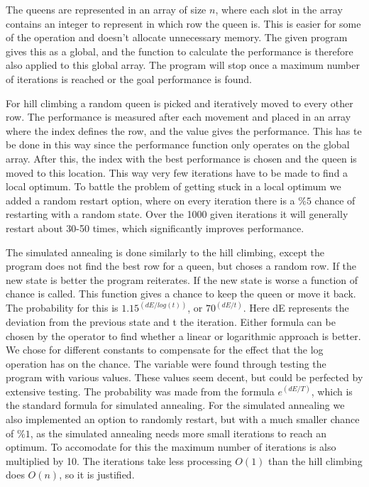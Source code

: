 \documentclass{article}
\begin{document}
The queens are represented in an array of size $n$, where each slot in the array contains an integer to represent in which row the queen is. This is easier for some of the operation and doesn't allocate unnecessary memory. The given program gives this as a global, and the function to calculate the performance is therefore also applied to this global array. The program will stop once a maximum number of iterations is reached or the goal performance is found. 

For hill climbing a random queen is picked and iteratively moved to every other row. The performance is measured after each movement and placed in an array where the index defines the row, and the value gives the performance. This has te be done in this way since the performance function only operates on the global array. After this, the index with the best performance is chosen and the queen is moved to this location. This way very few iterations have to be made to find a local optimum. To battle the problem of getting stuck in a local optimum we added a random restart option, where on every iteration there is a $\%5$ chance of restarting with a random state. Over the 1000 given iterations it will generally restart about 30-50 times, which significantly improves performance. 

The simulated annealing is done similarly to the hill climbing, except the program does not find the best row for a queen, but choses a random row. If the new state is better the program reiterates. If the new state is worse a function of chance is called. This function gives a chance to keep the queen or move it back. The probability for this is $1.15^(dE / log(t))$, or $70^(dE/t)$. Here dE represents the deviation from the previous state and t the iteration. Either formula can be chosen by the operator to find whether a linear or logarithmic approach is better. We chose for different constants to compensate for the effect that the log operation has on the chance. The variable were found through testing the program with various values. These values seem decent, but could be perfected by extensive testing. The probability was made from the formula $e^(dE/T)$, which is the standard formula for simulated annealing. For the simulated annealing we also implemented an option to randomly restart, but with a much smaller chance of $\%1$, as the simulated annealing needs more small iterations to reach an optimum. To accomodate for this the maximum number of iterations is also multiplied by 10. The iterations take less processing $O(1)$ than the hill climbing does $O(n)$, so it is justified.
\end{document}
